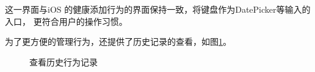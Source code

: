 这一界面与iOS 的健康添加行为的界面保持一致，将键盘作为DatePicker等输入的入口，
更符合用户的操作习惯。

为了更方便的管理行为，还提供了历史记录的查看，如图\ref{fig:history}。

\begin{figure}[!htbp]
	\centering
	\caption{查看历史行为记录}
	\label{fig:history}
\end{figure}